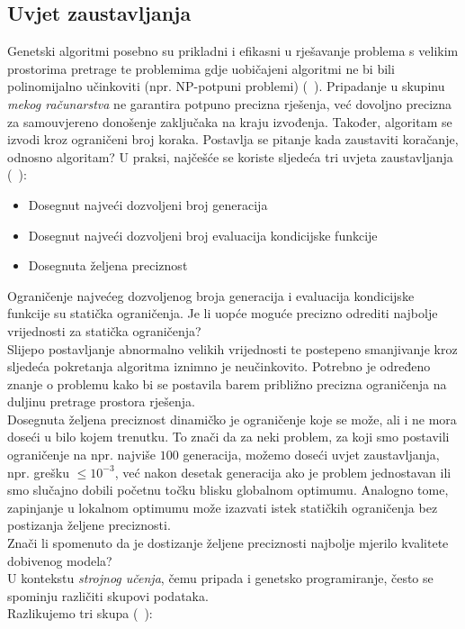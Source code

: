 \subsection{Uvjet zaustavljanja}
Genetski algoritmi posebno su prikladni i efikasni u rješavanje problema s velikim prostorima pretrage te problemima gdje uobičajeni algoritmi ne bi bili polinomijalno učinkoviti (npr. NP-potpuni problemi) (~\cite{brassard1988algorithmics}).
Pripadanje u skupinu \emph{mekog računarstva} ne garantira potpuno precizna rješenja, već dovoljno precizna za samouvjereno donošenje zaključaka na kraju izvođenja.
Također, algoritam se izvodi kroz ograničeni broj koraka.
Postavlja se pitanje kada zaustaviti koračanje, odnosno algoritam?
U praksi, najčešće se koriste sljedeća tri uvjeta zaustavljanja (~\cite{ga_stopping_criteria}):
\begin{itemize}
	\item Dosegnut najveći dozvoljeni broj generacija
	\item Dosegnut najveći dozvoljeni broj evaluacija kondicijske funkcije
	\item Dosegnuta željena preciznost
\end{itemize}
Ograničenje najvećeg dozvoljenog broja generacija i evaluacija kondicijske funkcije su statička ograničenja.
Je li uopće moguće precizno odrediti najbolje vrijednosti za statička ograničenja? \\
Slijepo postavljanje abnormalno velikih vrijednosti te postepeno smanjivanje kroz sljedeća pokretanja algoritma iznimno je neučinkovito.
Potrebno je određeno znanje o problemu kako bi se postavila barem približno precizna ograničenja na duljinu pretrage prostora rješenja. \\
Dosegnuta željena preciznost dinamičko je ograničenje koje se može, ali i ne mora doseći u bilo kojem trenutku.
To znači da za neki problem, za koji smo postavili ograničenje na npr. najviše $100$ generacija, možemo doseći uvjet zaustavljanja, npr. grešku $\leq 10^{-3}$, već nakon desetak generacija ako je problem jednostavan ili smo slučajno dobili početnu točku blisku globalnom optimumu.
Analogno tome, zapinjanje u lokalnom optimumu može izazvati istek statičkih ograničenja bez postizanja željene preciznosti. \\
Znači li spomenuto da je dostizanje željene preciznosti najbolje mjerilo kvalitete dobivenog modela? \\
U kontekstu \emph{strojnog učenja}, čemu pripada i genetsko programiranje, često se spominju različiti skupovi podataka. \\
Razlikujemo tri skupa (~\cite{datasets}):


